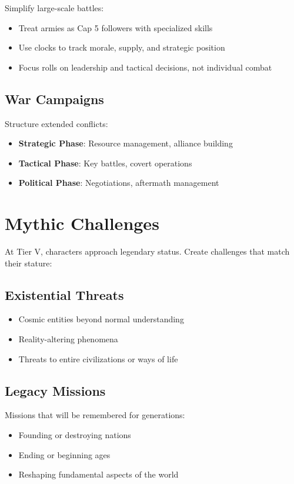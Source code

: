 Simplify large-scale battles:
\begin{itemize}
    \item Treat armies as Cap 5 followers with specialized skills
    \item Use clocks to track morale, supply, and strategic position
    \item Focus rolls on leadership and tactical decisions, not individual combat
\end{itemize}

\subsection*{War Campaigns}

Structure extended conflicts:
\begin{itemize}
    \item \textbf{Strategic Phase}: Resource management, alliance building
    \item \textbf{Tactical Phase}: Key battles, covert operations
    \item \textbf{Political Phase}: Negotiations, aftermath management
\end{itemize}

\section{Mythic Challenges}

At Tier V, characters approach legendary status. Create challenges that match their stature:

\subsection*{Existential Threats}

\begin{itemize}
    \item Cosmic entities beyond normal understanding
    \item Reality-altering phenomena
    \item Threats to entire civilizations or ways of life
\end{itemize}

\subsection*{Legacy Missions}

Missions that will be remembered for generations:
\begin{itemize}
    \item Founding or destroying nations
    \item Ending or beginning ages
    \item Reshaping fundamental aspects of the world
\end{itemize}

